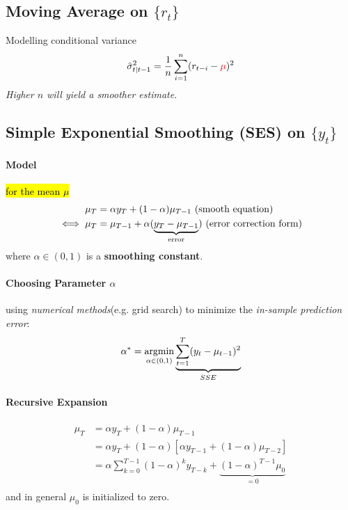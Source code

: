 \documentclass[11pt]{article}
\begin{document}
		\subsection{Moving Average on $\{r_t\}$}
			\begin{definition}
				Modelling conditional variance
				\begin{equation}
					\hat{\sigma}^2_{t|t-1} = \frac{1}{n} \sum_{i=1}^n (r_{t-i} - \textcolor{red}{\mu})^2
				\end{equation}
				\emph{Higher $n$ will yield a smoother estimate}.
			\end{definition}
		
		\subsection{Simple Exponential Smoothing (SES) on $\{y_t\}$}
			\paragraph{Model} \hl{for the mean $\mu$}
				\begin{align}
					\mu_T &= \alpha y_T + (1 - \alpha)\mu_{T-1} \text{{ (smooth equation)}} \\
					\iff \mu_T &= \mu_{T-1} + \alpha (\underbrace{y_T - \mu_{T-1}}_{\text{{error}}}) \text{{ (error correction form)}}
				\end{align}
				where $\alpha \in (0, 1)$ is a \textbf{smoothing constant}.
				
			\paragraph{Choosing Parameter $\alpha$} using \emph{numerical methods}(e.g. grid search) to minimize the \emph{in-sample prediction error}:
				\begin{gather}
					\alpha^* = \operatorname*{argmin}_{\alpha \in (0, 1)} \underbrace{\sum_{t=1}^T(y_t - \mu_{t-1})^2}_{SSE}
				\end{gather}
			
			\paragraph{Recursive Expansion}
				\begin{align}
					\mu_T &= \alpha y_T + (1 - \alpha) \mu_{T-1} \\
					&= \alpha y_T + (1 - \alpha) [\alpha y_{T-1} + (1 - \alpha) \mu_{T-2}] \\
					&= \alpha \sum_{k=0}^{T-1}(1-\alpha)^k y_{T-k} + \underbrace{(1 - \alpha)^{T-1} \mu_0}_{=0} \\
				\end{align}
				and in general $\mu_0$ is initialized to zero.
		
\end{document}
